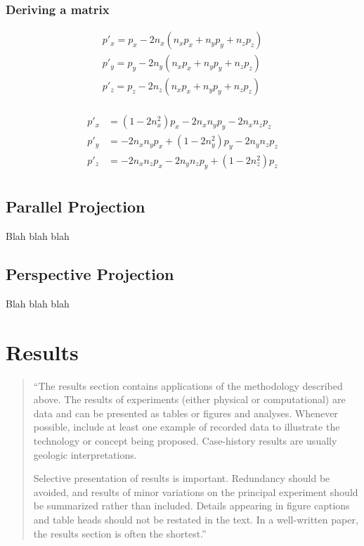 \documentclass[]{report}   %
\begin{document}
\subsection{Deriving a matrix}

\begin{align*}
	p\prime_x = p_x - 2n_x(n_x p_x + n_y p_y + n_z p_z)		\\
	p\prime_y = p_y - 2n_y(n_x p_x + n_y p_y + n_z p_z)		\\
	p\prime_z = p_z - 2n_z(n_x p_x + n_y p_y + n_z p_z)		\\
\end{align*}

\begin{align*}
	p\prime_x &= (1 - 2n_x^2)p_x -2n_x n_y p_y -2n_x n_z p_z	\\
	p\prime_y &= -2n_x n_y p_x + (1 - 2n_y^2)p_y -2n_y n_z p_z	\\
	p\prime_z &= -2n_x n_z p_x -2n_y n_z p_y + (1 - 2n_z^2)p_z	\\
\end{align*}



\section{Parallel Projection}

Blah blah blah


\section{Perspective Projection}

Blah blah blah





\chapter{Results}           %

\begin{quotation}
	``The results section contains applications of the methodology described above. The results of experiments
	(either physical or computational) are data and can be presented as tables or figures and analyses. Whenever
	possible, include at least one example of recorded data to illustrate the technology or concept being proposed.
	Case-history results are usually geologic interpretations.

	Selective presentation of results is important. Redundancy should be avoided, and results of minor variations on
	the principal experiment should be summarized rather than included. Details appearing in figure captions and
	table heads should not be restated in the text. In a well-written paper, the results section is often the
	shortest.''
\end{quotation}
\end{document}
